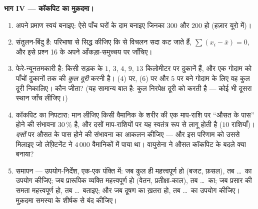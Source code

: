 \begin{problem}[{सप्ताहांत समस्या --- माध्य बनाम माध्यिका: बहिर्मान,
अंक-सुधार, सड़क किनारे का गोदाम, और वह कॉकपिट जो किसी के लिए नहीं बना}]
\medskip
\noindent\textbf{भाग IV --- कॉकपिट का मुक़दमा।}
\begin{enumerate}[resume]
  \item अपने प्रमाण स्वयं बनाइए: ऐसे पाँच घरों के दाम बनाइए जिनका 
        $300$ और  $200$ हो (हज़ार यूरो में)।
  \item {} संतुलन-बिंदु है: परिभाषा से सिद्ध कीजिए कि  से विचलन सदा
        कट जाते हैं, $\sum (x_i - \bar x) = 0$, और इसे प्रश्न 16 के अपने आँकड़ा-समुच्चय पर
        जाँचिए।
  \item {} फेरे-न्यूनतमकारी है: किसी सड़क के $1$, $3$, $4$,
        $9$, $13$ किलोमीटर पर दुकानें हैं, और एक गोदाम को पाँचों दुकानों
        तक की \emph{कुल दूरी}  करनी है।  ($4$) पर, 
        ($6$) पर और $5$ पर बने गोदाम के लिए वह कुल दूरी निकालिए। कौन
        जीता? (यह सामान्य बात है:  कुल निरपेक्ष दूरी को 
        करती है --- कोई भी दूसरा स्थान जाँच लीजिए।)
  \item कॉकपिट का निपटारा: मान लीजिए किसी वैमानिक के शरीर की एक माप-राशि
        पर ``औसत के पास'' होने की संभावना $30\,\%$ है, और दसों माप-राशियों पर
        यह स्वतंत्र रूप से लागू होती है ($10$ राशियाँ)। \emph{दसों} पर
        औसत के पास होने की संभावना का आकलन कीजिए --- और इस परिणाम को उससे
        मिलाइए जो लेफ़्टिनेंट ने $4\,000$ वैमानिकों में पाया था। वायुसेना ने
        औसत कॉकपिट के बदले क्या बनाया?
  \item समापन --- उपयोग-निर्देश, एक-एक पंक्ति में: जब कुल ही महत्त्वपूर्ण
        हो (बजट, फ़सल), तब \dots\ का उपयोग कीजिए; जब प्रारूपिक व्यक्ति
        महत्त्वपूर्ण हो (वेतन, प्रतीक्षा-काल), तब \dots\ का; जब प्रसार की
        समता महत्त्वपूर्ण हो, तब \dots\ बताइए; और जब दूषण का ख़तरा हो, तब
        \dots\ का उपयोग कीजिए। मुक़दमा समस्या के शीर्षक से बंद कीजिए।
\end{enumerate}
\end{problem}
